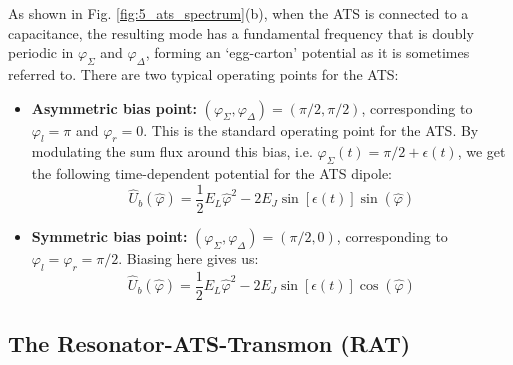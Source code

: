 As shown in Fig. \ref{fig:5_ats_spectrum}(b), when the ATS is connected to a capacitance, the resulting mode has a fundamental frequency that is doubly periodic in $\varphi_\Sigma$ and $\varphi_\Delta$, forming an `egg-carton' potential as it is sometimes referred to. There are two typical operating points for the ATS:

\begin{itemize}
    \item \textbf{Asymmetric bias point:} $(\varphi_\Sigma, \varphi_\Delta) = (\pi/2, \pi/2)$, corresponding to $\varphi_l = \pi$ and $\varphi_r = 0$. This is the standard operating point for the ATS. By modulating the sum flux around this bias, i.e. $\varphi_\Sigma(t) = \pi/2 + \epsilon(t)$, we get the following time-dependent potential for the ATS dipole:
    \begin{equation}
        \hat{U}_b(\hat{\varphi}) = \frac{1}{2}E_L \hat{\varphi}^2 - 2E_J \sin[\epsilon(t)]\sin(\hat{\varphi})
    \end{equation}
\item \textbf{Symmetric bias point:} $(\varphi_\Sigma, \varphi_\Delta) = (\pi/2, 0)$, corresponding to $\varphi_l = \varphi_r = \pi/2$. Biasing here gives us:
\begin{equation}
        \hat{U}_b(\hat{\varphi}) = \frac{1}{2}E_L \hat{\varphi}^2 - 2E_J \sin[\epsilon(t)]\cos(\hat{\varphi})
    \end{equation}
\end{itemize}
\subsection{The Resonator-ATS-Transmon (RAT)}

